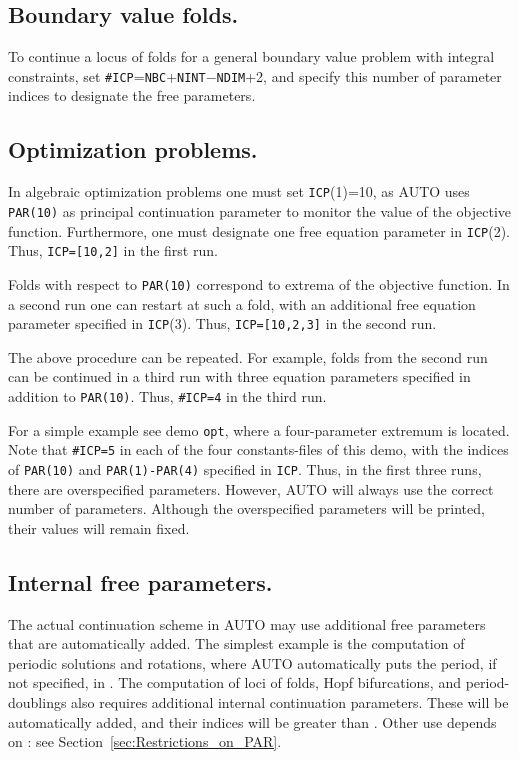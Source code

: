 \documentclass[12pt]{report}
\begin{document}
\subsection{ Boundary value folds.}
To continue a locus of folds for a general boundary value problem
with integral constraints, set {\tt \#ICP}={\tt NBC}+{\tt NINT}$-${\tt NDIM}+2, 
and specify this number of parameter indices to designate the free parameters.

\subsection{ Optimization problems.}
In algebraic optimization problems one must set {\tt ICP}(1)=10, 
as {\cal AUTO} uses {\tt PAR(10)} as principal continuation parameter
to monitor the value of the objective function.
Furthermore, one must designate one free equation parameter in {\tt ICP}(2). 
Thus, {\tt ICP=[10,2]} in the first run.

Folds with respect to {\tt PAR(10)} correspond to extrema of the objective function.
In a second run one can restart at such a fold, with an additional
free equation parameter specified in {\tt ICP}(3).
Thus, {\tt ICP=[10,2,3]} in the second run.

The above procedure can be repeated.
For example, folds from the second run can be continued in a third run
with three equation parameters specified in addition to {\tt PAR(10)}.
Thus, {\tt \#ICP=4} in the third run.

For a simple example see demo {\tt opt}, where a four-parameter extremum
is located.
Note that {\tt \#ICP=5} in each of the four constants-files of this demo, 
with the indices of {\tt PAR(10)} and {\tt PAR(1)-PAR(4)} specified in {\tt ICP}.
Thus, in the first three runs, there are overspecified parameters.
However, {\cal AUTO} will always use the correct number of parameters.
Although the overspecified parameters will be printed, their values will
remain fixed. 

\subsection{ Internal free parameters.}
The actual continuation scheme in {\cal AUTO} may use additional free
parameters that are automatically added.
The simplest example is the computation of periodic solutions and rotations,
where {\cal AUTO} automatically puts the period, if not specified, in
.
The computation of loci of folds, Hopf bifurcations, and period-doublings
also requires additional internal continuation parameters.
These will be automatically added, and their indices will be greater
than .
Other use depends on : see Section~\ref{sec:Restrictions_on_PAR}.
\end{document}
